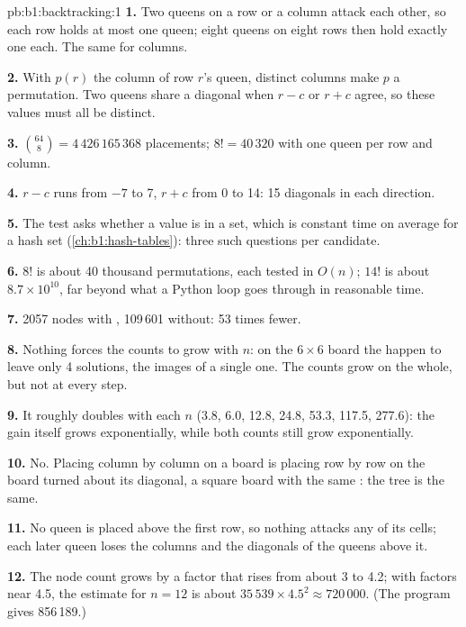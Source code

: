 \begin{solution}{pb:b1:backtracking:1}
\textbf{1.} Two queens on a row or a column attack each other, so each row holds at most one queen; eight queens on eight
rows then hold exactly one each. The same for columns.

\textbf{2.} With $p(r)$ the column of row $r$'s queen, distinct columns make $p$ a permutation. Two queens share a
diagonal when $r - c$ or $r + c$ agree, so these values must all be distinct.

\textbf{3.} $\binom{64}{8} = 4\,426\,165\,368$ placements; $8! = 40\,320$ with one queen per row and column.

\textbf{4.} $r - c$ runs from $-7$ to 7, $r + c$ from 0 to 14: 15 diagonals in each direction.

\textbf{5.} The test asks whether a value is in a set, which is constant time on average for a hash set
(\cref{ch:b1:hash-tables}): three such questions per candidate.

\textbf{6.} $8!$ is about 40 thousand permutations, each tested in $O(n)$; $14!$ is about $8.7 \times 10^{10}$, far
beyond what a Python loop goes through in reasonable time.

\textbf{7.} 2057 nodes with , 109\,601 without: 53 times fewer.

\textbf{8.} Nothing forces the counts to grow with $n$: on the $6 \times 6$ board the  happen to leave only
4 solutions, the images of a single one. The counts grow on the whole, but not at every step.

\textbf{9.} It roughly doubles with each $n$ (3.8, 6.0, 12.8, 24.8, 53.3, 117.5, 277.6): the gain itself grows
exponentially, while both counts still grow exponentially.

\textbf{10.} No. Placing column by column on a board is placing row by row on the board turned about its diagonal, a
square board with the same : the tree is the same.

\textbf{11.} No queen is placed above the first row, so nothing attacks any of its cells; each later queen loses the
columns and the diagonals of the queens above it.

\textbf{12.} The node count grows by a factor that rises from about 3 to 4.2; with factors near 4.5, the estimate for
$n = 12$ is about $35\,539 \times 4.5^2 \approx 720\,000$. (The program gives 856\,189.)


\end{solution}
